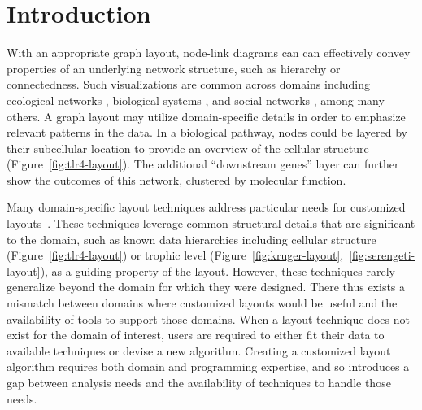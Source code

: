 \section{Introduction}
With an appropriate graph layout, node-link diagrams can
can effectively convey properties of an underlying
network structure, such as hierarchy or connectedness. Such visualizations are common across domains including ecological networks
\cite{hinke2004visualizing,harper2006dynamic,lavigne1996cod,baskerville2011spatial,yodzis1998local,cohen2003ecological,kearney2016blog,benson2016higher,kruger2017},
biological systems
\cite{barsky2008cerebral,shannon2003cytoscape,gehlenborg2010visualization,saraiya2005visualizing,becker2001graph},
and social networks
\cite{scott1988social,rothenberg1998using,fitzpatrick2001preventable,mcelroy2003network,fu2011hiv}, 
among many others. A graph layout may utilize
domain-specific details in order to emphasize relevant patterns in the
data. 
In a biological pathway, nodes could be layered by their 
subcellular location to provide an overview of the cellular structure
(Figure~\ref{fig:tlr4-layout}). The additional ``downstream genes'' layer
can further show the outcomes of this network, clustered by molecular function.

\tlrfourLayout

Many domain-specific layout techniques address particular needs
for customized layouts~\cite{barsky2008cerebral,genc2003constrained,shannon2003cytoscape,kearney2017d3,kearney2017ecopath}. These
techniques leverage common structural details that are significant to the
domain, such as known data hierarchies including cellular 
structure (Figure~\ref{fig:tlr4-layout}) or trophic level
(Figure~\ref{fig:kruger-layout},~\ref{fig:serengeti-layout}), as a guiding property of the
layout. However, these techniques rarely generalize beyond the domain for
which they were designed. There thus exists a mismatch between domains
where customized layouts would be useful and the availability of tools to
support those domains. When a layout technique does not exist for the
domain of interest, users are required to either fit their data
to available techniques or devise a new algorithm. Creating a
customized layout algorithm requires both
domain and programming expertise, and so introduces a gap between 
analysis needs and the availability of techniques to
handle those needs.

